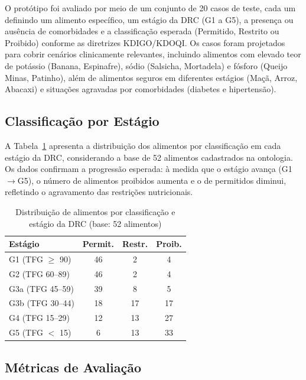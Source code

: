 \documentclass[12pt, a4paper, twocolumn]{article}
\begin{document}
O protótipo foi avaliado por meio de um conjunto de 20 casos de teste, cada um definindo um alimento específico, um estágio da DRC (G1 a G5), a presença ou ausência de comorbidades e a classificação esperada (Permitido, Restrito ou Proibido) conforme as diretrizes KDIGO/KDOQI. Os casos foram projetados para cobrir cenários clinicamente relevantes, incluindo alimentos com elevado teor de potássio (Banana, Espinafre), sódio (Salsicha, Mortadela) e fósforo (Queijo Minas, Patinho), além de alimentos seguros em diferentes estágios (Maçã, Arroz, Abacaxi) e situações agravadas por comorbidades (diabetes e hipertensão).

    \subsection{Classificação por Estágio}

A Tabela~\ref{tab:resultados_estagio} apresenta a distribuição dos alimentos por classificação em cada estágio da DRC, considerando a base de 52 alimentos cadastrados na ontologia. Os dados confirmam a progressão esperada: à medida que o estágio avança (G1$\rightarrow$G5), o número de alimentos proibidos aumenta e o de permitidos diminui, refletindo o agravamento das restrições nutricionais.

\begin{table}[h]
\centering
\caption{Distribuição de alimentos por classificação e estágio da DRC (base: 52 alimentos)}
\label{tab:resultados_estagio}
\footnotesize
\begin{tabular}{|l|c|c|c|}
\hline
\textbf{Estágio} & \textbf{Permit.} & \textbf{Restr.} & \textbf{Proib.} \\
\hline
G1 (TFG $\geq$ 90)  & 46 & 2  & 4  \\
\hline
G2 (TFG 60--89)      & 46 & 2  & 4  \\
\hline
G3a (TFG 45--59)     & 39 & 8  & 5  \\
\hline
G3b (TFG 30--44)     & 18 & 17 & 17 \\
\hline
G4 (TFG 15--29)      & 12 & 13 & 27 \\
\hline
G5 (TFG $<$ 15)      & 6  & 13 & 33 \\
\hline
\end{tabular}
\end{table}

    \subsection{Métricas de Avaliação}
\end{document}
